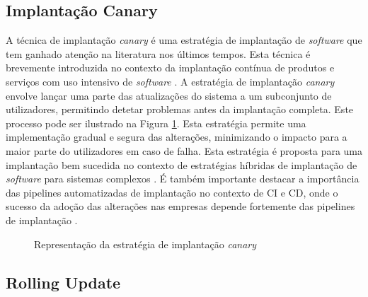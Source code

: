 \subsection{Implantação Canary}

A técnica de implantação \textit{canary} é uma estratégia de implantação de \textit{software} que 
tem ganhado atenção na literatura nos últimos tempos. Esta técnica é brevemente introduzida no 
contexto da implantação contínua de produtos e serviços com uso intensivo de \textit{software} \cite{canary2017}. 
A estratégia de implantação \textit{canary} envolve lançar uma parte das atualizações do sistema a 
um subconjunto de utilizadores, permitindo detetar problemas antes da implantação completa.
Este processo pode ser ilustrado na Figura \ref{fig:canary}. Esta estratégia permite uma 
implementação gradual e segura das alterações, minimizando o impacto para a maior parte do 
utilizadores em caso de falha. Esta estratégia é proposta para uma implantação bem sucedida no 
contexto de estratégias híbridas de implantação de \textit{software} para sistemas complexos 
\cite{canary2022}. É também importante destacar a importância das \glspl{pipeline} automatizadas 
de implantação no contexto de \ac{CI} e \ac{CD}, onde o sucesso da adoção das alterações nas 
empresas depende fortemente das \glspl{pipeline} de implantação \cite{canary2017b}. 

\begin{figure}[H]
    \centering
    \qquad
    \caption{Representação da estratégia de implantação \textit{canary}}%
    \label{fig:canary}%
\end{figure}

\subsection{Rolling Update}

